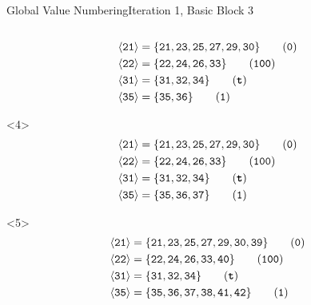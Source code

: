\documentclass{beamer}
\newcommand{\vn}[1]{\ensuremath{\langle\texttt{#1}\rangle}}
\newcommand{\vreg}[1]{\texttt{#1}}
\begin{document}
\begin{frame}[fragile]{Global Value Numbering}{Iteration 1, Basic Block 3}
\begin{columns}[t,onlytextwidth]
\begin{column}{.5\textwidth}
\begin{onlyenv}
\begin{align*}
          \vn{21} &= \{\vreg{21},
                       \vreg{23},
                       \vreg{25},
                       \vreg{27},
                       \vreg{29},
                       \vreg{30}\} \tag{\texttt{0}} \\
          \vn{22} &= \{\vreg{22},
                       \vreg{24},
                       \vreg{26},
                       \vreg{33}\} \tag{\texttt{100}} \\
          \vn{31} &= \{\vreg{31},
                       \vreg{32},
                       \vreg{34}\} \tag{\texttt{\textbf{t}}} \\
          \vn{35} &= \{\vreg{35},
                       \vreg{36}\} \tag{\texttt{1}}
        \end{align*}
      \end{onlyenv}
      \begin{onlyenv}<4>
        \begin{align*}
          \vn{21} &= \{\vreg{21},
                       \vreg{23},
                       \vreg{25},
                       \vreg{27},
                       \vreg{29},
                       \vreg{30}\} \tag{\texttt{0}} \\
          \vn{22} &= \{\vreg{22},
                       \vreg{24},
                       \vreg{26},
                       \vreg{33}\} \tag{\texttt{100}} \\
          \vn{31} &= \{\vreg{31},
                       \vreg{32},
                       \vreg{34}\} \tag{\texttt{\textbf{t}}} \\
          \vn{35} &= \{\vreg{35},
                       \vreg{36},
                       \vreg{37}\} \tag{\texttt{1}}
        \end{align*}
      \end{onlyenv}
      \begin{onlyenv}<5>
        \begin{align*}
          \vn{21} &= \{\vreg{21},
                       \vreg{23},
                       \vreg{25},
                       \vreg{27},
                       \vreg{29},
                       \vreg{30},
                       \vreg{39}\} \tag{\texttt{0}} \\
          \vn{22} &= \{\vreg{22},
                       \vreg{24},
                       \vreg{26},
                       \vreg{33},
                       \vreg{40}\} \tag{\texttt{100}} \\
          \vn{31} &= \{\vreg{31},
                       \vreg{32},
                       \vreg{34}\} \tag{\texttt{\textbf{t}}} \\
          \vn{35} &= \{\vreg{35},
                       \vreg{36},
                       \vreg{37},
                       \vreg{38},
                       \vreg{41},
                       \vreg{42}\} \tag{\texttt{1}}
        \end{align*}
      \end{onlyenv}
    \end{column}
  \end{columns}
\end{frame}
\end{document}
